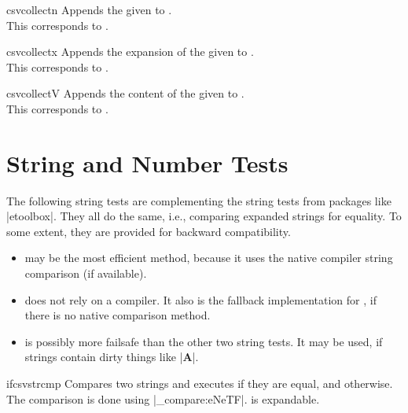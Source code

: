 \documentclass[a4paper,11pt]{ltxdoc}
\begin{document}
\begin{docCommand}[doc new=2021-07-06]{csvcollectn}{}
  Appends the given  to .\\
  This corresponds to .
\end{docCommand}


\begin{docCommand}[doc new=2021-07-06]{csvcollectx}{}
  Appends the expansion of the given  to .\\
  This corresponds to .
\end{docCommand}

\begin{docCommand}[doc new=2021-07-06]{csvcollectV}{}
  Appends the content of the given  to .\\
  This corresponds to .
\end{docCommand}


\clearpage
\section{String and Number Tests}\label{sec:stringtests}%

The following string tests are complementing the string tests
from packages like |etoolbox|. They all do the same, i.e.,
comparing expanded strings for equality. To some extent, they are
provided for backward compatibility.
\begin{itemize}
\item{} may be the most efficient method, because it uses
  the  native compiler string comparison (if available).
\item{} does not rely on a compiler. It also is the
  fallback implementation for , if there is no
  native comparison method.
\item{} is possibly more failsafe than the other two
  string tests. It may be used, if strings contain dirty things like |\textbf{A}|.
\end{itemize}
\medskip

\begin{docCommand}[doc new and updated={2016-07-01}{2021-06-28}]{ifcsvstrcmp}{}
  Compares two strings and executes  if they are equal, and  otherwise.
  The comparison is done using |\str_compare:eNeTF|.
   is expandable.
\end{docCommand}
\end{document}
